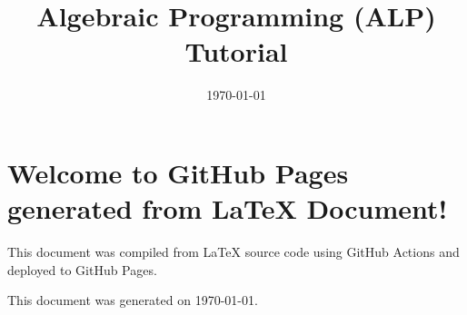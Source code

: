 \documentclass{article}
\title{Algebraic Programming (ALP) Tutorial}
\author{}
\date{\today} %
\begin{document}
\maketitle

\section{Welcome to GitHub Pages generated from LaTeX Document!}

This document was compiled from \LaTeX{} source code using GitHub Actions and deployed to GitHub Pages.

\tableofcontents






\vfill %
\centering
\small This document was generated on \today.
\end{document}
